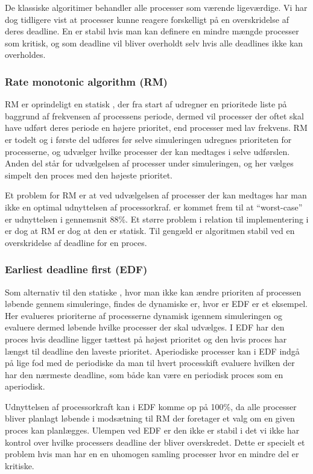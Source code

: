 De klassiske algoritimer behandler alle processer som værende ligeværdige. Vi har dog tidligere vist at processer kunne reagere forskelligt på en overskridelse af deres deadline. En \sched er stabil hvis man kan definere en mindre mængde processer som kritisk, og som deadline vil bliver overholdt selv hvis alle deadlines ikke kan overholdes.

\subsubsection{Rate monotonic algorithm (RM)}
RM er oprindeligt en statisk \sched, der fra start af udregner en prioritede liste på baggrund af frekvensen af processens periode, dermed vil processer der oftet skal have udført deres periode en højere prioritet, end processer med lav frekvens. RM er todelt og i første del udføres før selve simuleringen udregnes  prioriteten for processerne, og udvælger hvilke processer der kan medtages i selve udførslen. Anden del står for udvælgelsen af processer  under simuleringen, og her vælges simpelt den proces med den højeste prioritet. 

 Et problem for RM er at ved udvælgelsen af processer der kan medtages har man ikke en optimal udnyttelsen af processorkraf.  er kommet frem til at ``worst-case'' er udnyttelsen i gennemsnit 88\%\cite{lehoczky1989rate}. Et større problem i relation til implementering i \pycsp er dog at RM er dog at den er statisk. Til gengæld er algoritmen stabil ved en overskridelse af deadline for en proces. 

\subsubsection{Earliest deadline first (EDF)}
Som alternativ til den statiske \sched, hvor man ikke kan ændre prioriten af processen løbende gennem simuleringe, findes de dynamiske \sched er, hvor er EDF er et eksempel. Her evalueres prioriterne af processerne dynamisk igennem simuleringen og evaluere dermed løbende hvilke processer der skal udvælges. I EDF har den proces hvis deadline ligger tættest på højest prioritet og den hvis proces har længst til deadline den laveste prioritet. Aperiodiske processer kan i EDF indgå på lige fod med de periodiske da man til hvert processkift evaluere hvilken der har den nærmeste deadline, som både kan være en periodisk proces som en aperiodisk.

Udnyttelsen af processorkraft kan i EDF komme op på 100\%, da alle processer bliver planlagt løbende i modsætning til RM der foretager et valg om en given proces kan planlægges.  Ulempen ved EDF er den ikke er stabil i det vi ikke har kontrol over hvilke processers deadline der bliver overskredet. Dette er specielt et problem hvis man har en en uhomogen samling processer hvor en mindre del er kritiske.

